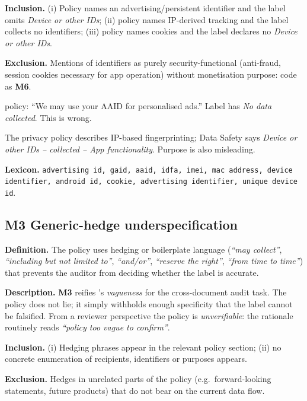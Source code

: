 \documentclass[11pt,a4paper]{article}
\newcommand{\code}[1]{\textsf{\textbf{#1}}}
\begin{document}
\textbf{Inclusion.} (i) Policy names an advertising/persistent
identifier and the label omits \textsl{Device or other IDs}; (ii)
policy names IP-derived tracking and the label collects no
identifiers; (iii) policy names cookies and the label declares no
\textsl{Device or other IDs}.

\textbf{Exclusion.} Mentions of identifiers as purely
security-functional (anti-fraud, session cookies necessary for app
operation) without monetisation purpose: code as \code{M6}.

\begin{rationale}
[APP-$0671$] policy: ``We may use your AAID for personalised ads.''
Label has \textsl{No data collected}. This is wrong.
\end{rationale}
\begin{rationale}
The privacy policy describes IP-based fingerprinting; Data Safety
says \textsl{Device or other IDs -- collected -- App functionality}.
Purpose is also misleading.
\end{rationale}

\textbf{Lexicon.} \texttt{advertising id, gaid, aaid, idfa, imei,
mac address, device identifier, android id, cookie, advertising
identifier, unique device id}.

\subsection{\code{M3} Generic-hedge underspecification}
\label{sec:M3}
\textbf{Definition.} The policy uses hedging or boilerplate language
(\textit{``may collect''}, \textit{``including but not limited to''},
\textit{``and/or''}, \textit{``reserve the right''},
\textit{``from time to time''}) that prevents the auditor from
deciding whether the label is accurate.

\textbf{Description.} \code{M3} reifies \citet{bhatia2016theory}'s
\emph{vagueness} for the cross-document audit task. The policy does
not lie; it simply withholds enough specificity that the label cannot
be falsified. From a reviewer perspective the policy is
\emph{unverifiable}: the rationale routinely reads
\textit{``policy too vague to confirm''}.

\textbf{Inclusion.} (i) Hedging phrases appear in the relevant policy
section; (ii) no concrete enumeration of recipients, identifiers or
purposes appears.

\textbf{Exclusion.} Hedges in unrelated parts of the policy (e.g.\
forward-looking statements, future products) that do not bear on the
current data flow.
\end{document}
